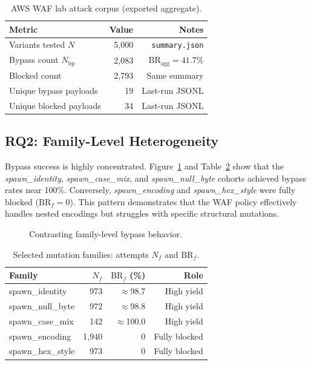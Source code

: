 \begin{table}[h]
  \centering
  \caption{AWS WAF lab attack corpus (exported aggregate).}
  \label{tab:dataset}
  \begin{tabular}{lrr}
    \toprule
    Metric & Value & Notes \\
    \midrule
    Variants tested $N$ & 5{,}000 & \texttt{summary.json} \\
    Bypass count $N_{\mathrm{bp}}$ & 2{,}083 & $\mathrm{BR}_{\mathrm{agg}}=41.7\%$ \\
    Blocked count & 2{,}793 & Same summary \\
    Unique bypass payloads & 19 & Last-run JSONL \\
    Unique blocked payloads & 34 & Last-run JSONL \\
    \bottomrule
  \end{tabular}
\end{table}

\subsection{RQ2: Family-Level Heterogeneity}
Bypass success is highly concentrated. Figure~\ref{fig:bypass} and Table~\ref{tab:bypass_categories} show that the \emph{spawn\_identity}, \emph{spawn\_case\_mix}, and \emph{spawn\_null\_byte} cohorts achieved bypass rates near 100\%. Conversely, \emph{spawn\_encoding} and \emph{spawn\_hex\_style} were fully blocked ($\mathrm{BR}_f=0$). This pattern demonstrates that the WAF policy effectively handles nested encodings but struggles with specific structural mutations.

\begin{figure}[h]
  \centering
  \caption{Contrasting family-level bypass behavior.}
  \label{fig:bypass}
\end{figure}

\begin{table}[h]
  \centering
  \caption{Selected mutation families: attempts $N_f$ and $\mathrm{BR}_f$.}
  \label{tab:bypass_categories}
  \begin{tabular}{lrrr}
    \toprule
    Family & $N_f$ & $\mathrm{BR}_f$ (\%) & Role \\
    \midrule
    spawn\_identity & 973 & $\approx$98.7 & High yield \\
    spawn\_null\_byte & 972 & $\approx$98.8 & High yield \\
    spawn\_case\_mix & 142 & $\approx$100.0 & High yield \\
    spawn\_encoding & 1{,}940 & $0$ & Fully blocked \\
    spawn\_hex\_style & 973 & $0$ & Fully blocked \\
    \bottomrule
  \end{tabular}
\end{table}

